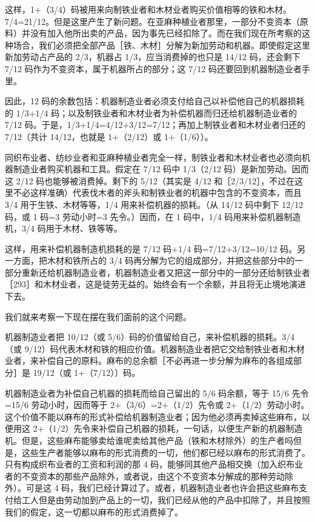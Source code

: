 \todo{}

这样，1+（3/4）码被用来向制铁业者和木材业者购买价值相等的铁和木材。7/4=21/12。但是这里产生了新问题。在亚麻种植业者那里，一部分不变资本（原料）并没有加入他所出卖的产品，因为事先已经扣除了。而在我们现在所考察的这种场合，我们必须把全部产品［铁、木材］分解为新加劳动和机器。即使假定这里新加劳动占产品的 2/3，机器占 1/3，应当消费掉的也只是 14/12 码，还会剩下 7/12 码作为不变资本，属于机器所占的部分；这 7/12 码还要回到机器制造业者手里。

因此，12 码的余数包括：机器制造业者必须支付给自己以补偿他自己的机器损耗的 1/3+1/4 码；以及制铁业者和木材业者为补偿机器而归还给机器制造业者的 7/12 码。于是，1/3+1/4=4/12+3/12=7/12；再加上制铁业者和木材业者归还的 7/12（共计 14/12，也就是 1+（2/12）或 1+（1/6））。

同织布业者、纺纱业者和亚麻种植业者完全一样，制铁业者和木材业者也必须向机器制造业者购买机器和工具。假定在 7/12 码中 1/3（2/12 码）是新加劳动。因而这 2/12 码也能够被消费掉。剩下的 5/12（其实是 4/12 和［2/3/12］，不过在这里不必这样准确）代表伐木者的斧头和制铁业者的机器中包含的不变资本，而且 3/4 用于生铁、木材等等，1/4 用来补偿机器的损耗。（从 14/12 码中剩下 12/12 码，或 1 码=3 劳动小时=3 先令。）因而，在 1 码中，1/4 码用来补偿机器制造机，3/4 码用于木材、铁等等。

这样，用来补偿机器制造机损耗的是 7/12 码+1/4 码=7/12+3/12=10/12 码。另一方面，把木材和铁所占的 3/4 码再分解为它的组成部分，并把这些部分中的一部分重新还给机器制造业者，机器制造业者又把这一部分中的一部分还给制铁业者［293］和木材业者，这是徒劳无益的。始终会有一个余额，并且将无止境地演进下去。


我们就来考察一下现在摆在我们面前的这个问题。

机器制造业者把 10/12（或 5/6）码的价值留给自己，来补偿机器的损耗。3/4（或 9/12）码代表木材和铁的相应价值。机器制造业者把它交给制铁业者和木材业者，来补偿自己的原料。麻布的总余额［不必再进一步分解为麻布的各组成部分］是 19/12（或 1+（7/12））码。

机器制造业者为补偿自己机器的损耗而给自己留出的 5/6 码余额，等于 15/6 先令=15/6 劳动小时，因而等于 2+（3/6）=2+（1/2）先令或 2+（1/2）劳动小时。这个价值不能以麻布的形式补偿给机器制造业者；因为他必须再卖掉这些麻布，以便用这 2+（1/2）先令来补偿自己机器的损耗，一句话，以便生产新的机器制造机。但是，这些麻布能够卖给谁呢卖给其他产品（铁和木材除外）的生产者吗但是，这些生产者能够以麻布的形式消费的一切，他们都已经以麻布的形式消费了。只有构成织布业者的工资和利润的那 4 码，能够同其他产品相交换（加入织布业者的不变资本的那些产品除外，或者说，由这个不变资本分解成的那种劳动除外）。可是这 4 码，我们已经计算过了。或者，机器制造业者也许会把这些麻布支付给工人但是由劳动加到产品上的一切，我们已经从他的产品中扣除了，并且按照我们的假定，这一切都以麻布的形式消费掉了。

